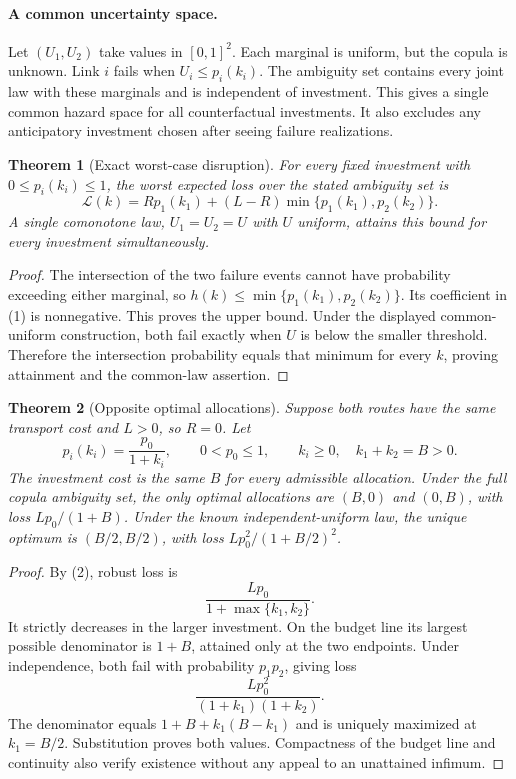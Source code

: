\documentclass[11pt]{article}
\newtheorem{theorem}{Theorem}
\theoremstyle{definition}
\begin{document}
\paragraph{A common uncertainty space.}
Let $(U_1,U_2)$ take values in $[0,1]^2$. Each marginal is uniform, but the copula is unknown. Link $i$ fails when $U_i\leq p_i(k_i)$. The ambiguity set contains every joint law with these marginals and is independent of investment. This gives a single common hazard space for all counterfactual investments. It also excludes any anticipatory investment chosen after seeing failure realizations.

\begin{theorem}[Exact worst-case disruption]
For every fixed investment with $0\leq p_i(k_i)\leq1$, the worst expected loss over the stated ambiguity set is
\[
 \mathcal L(k)=Rp_1(k_1)+(L-R)\min\{p_1(k_1),p_2(k_2)\}.
 \tag{2}
\]
A single comonotone law, $U_1=U_2=U$ with $U$ uniform, attains this bound for every investment simultaneously.
\end{theorem}
\begin{proof}
The intersection of the two failure events cannot have probability exceeding either marginal, so $h(k)\leq\min\{p_1(k_1),p_2(k_2)\}$. Its coefficient in (1) is nonnegative. This proves the upper bound. Under the displayed common-uniform construction, both fail exactly when $U$ is below the smaller threshold. Therefore the intersection probability equals that minimum for every $k$, proving attainment and the common-law assertion.
\end{proof}

\begin{theorem}[Opposite optimal allocations]
Suppose both routes have the same transport cost and $L>0$, so $R=0$. Let
\[
 p_i(k_i)=\frac{p_0}{1+k_i},\qquad
 0<p_0\leq1,\qquad k_i\geq0,\quad k_1+k_2=B>0.
\]
The investment cost is the same $B$ for every admissible allocation. Under the full copula ambiguity set, the only optimal allocations are $(B,0)$ and $(0,B)$, with loss $Lp_0/(1+B)$. Under the known independent-uniform law, the unique optimum is $(B/2,B/2)$, with loss $Lp_0^2/(1+B/2)^2$.
\end{theorem}
\begin{proof}
By (2), robust loss is
\[
 \frac{Lp_0}{1+\max\{k_1,k_2\}}.
\]
It strictly decreases in the larger investment. On the budget line its largest possible denominator is $1+B$, attained only at the two endpoints. Under independence, both fail with probability $p_1p_2$, giving loss
\[
 \frac{Lp_0^2}{(1+k_1)(1+k_2)}.
\]
The denominator equals $1+B+k_1(B-k_1)$ and is uniquely maximized at $k_1=B/2$. Substitution proves both values. Compactness of the budget line and continuity also verify existence without any appeal to an unattained infimum.
\end{proof}
\end{document}
